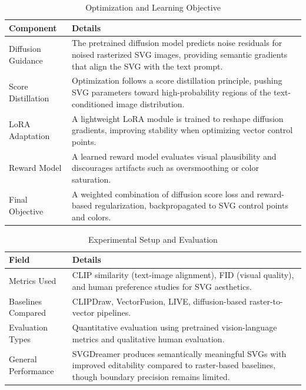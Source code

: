 \begin{table}[h!]
\centering
\caption{Optimization and Learning Objective}
\begin{tabular}{|l|p{10cm}|}
\hline
\textbf{Component} & \textbf{Details} \\ \hline

Diffusion Guidance &
The pretrained diffusion model predicts noise residuals for noised rasterized SVG images, providing semantic gradients that align the SVG with the text prompt. \\ \hline

Score Distillation &
Optimization follows a score distillation principle, pushing SVG parameters toward high-probability regions of the text-conditioned image distribution. \\ \hline

LoRA Adaptation &
A lightweight LoRA module is trained to reshape diffusion gradients, improving stability when optimizing vector control points. \\ \hline

Reward Model &
A learned reward model evaluates visual plausibility and discourages artifacts such as oversmoothing or color saturation. \\ \hline

Final Objective &
A weighted combination of diffusion score loss and reward-based regularization, backpropagated to SVG control points and colors. \\ \hline

\end{tabular}
\end{table}



\begin{table}[h!]
\centering
\caption{Experimental Setup and Evaluation}
\begin{tabular}{|l|p{10cm}|}
\hline
\textbf{Field} & \textbf{Details} \\ \hline

Metrics Used &
CLIP similarity (text-image alignment), FID (visual quality), and human preference studies for SVG aesthetics. \\ \hline

Baselines Compared &
CLIPDraw, VectorFusion, LIVE, diffusion-based raster-to-vector pipelines. \\ \hline

Evaluation Types &
Quantitative evaluation using pretrained vision-language metrics and qualitative human evaluation. \\ \hline

General Performance &
SVGDreamer produces semantically meaningful SVGs with improved editability compared to raster-based baselines, though boundary precision remains limited. \\ \hline

\end{tabular}
\end{table}



